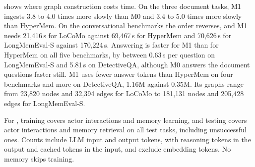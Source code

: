  shows where graph construction costs time. On the three document tasks, M1
ingests 3.8 to 4.0 times more slowly than M0 and 3.4 to 5.0 times more slowly than
HyperMem. On the conversational benchmarks the order reverses, and M1 needs 21{,}416\,s
for LoCoMo against 69{,}467\,s for HyperMem and 70{,}626\,s for LongMemEval-S against
170{,}224\,s. Answering is faster for M1 than for HyperMem on all five benchmarks, by between 0.63\,s per question on LongMemEval-S and 5.81\,s on DetectiveQA, although M0 answers
the document questions faster still. M1 uses fewer answer tokens than HyperMem on four
benchmarks and more on DetectiveQA, 1.16M against 0.35M. Its graphs range from 23{,}820
nodes and 32{,}394 edges for LoCoMo to 181{,}131 nodes and 205{,}428 edges for
LongMemEval-S.

For , training covers actor interactions and memory
learning, and testing covers actor interactions and memory retrieval on all test
tasks, including unsuccessful ones. Counts include LLM input and output tokens, with
reasoning tokens in the output and cached tokens in the input, and exclude embedding
tokens. No memory skips training.





